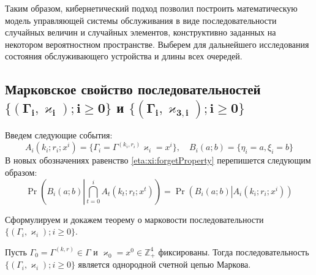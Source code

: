 \documentclass[a4paper,12pt,russian]{extarticle}
\newcommand{\Mark}{\{(\Gamma_i, \varkappa_i); i \geqslant 0\}}
\newcommand{\MarkThree}{\{(\Gamma_i, \varkappa_{3,i}); i \geqslant 0\}}
\begin{document}
Таким образом, кибернетический подход позволил построить математическую модель управляющей системы обслуживания в виде последовательности случайных величин и случайных элементов, конструктивно заданных на некотором вероятностном пространстве. Выберем для дальнейшего исследования состояния обслуживающего устройства и длины всех очередей.

\subsection[Марковское свойство последовательностей $\boldsymbol{\Mark}$ и $\boldsymbol{\MarkThree}$]%
{Марковское свойство последовательностей \\ $\boldsymbol{\Mark}$ и $\boldsymbol{\MarkThree}$}

Введем следующие события:
\begin{equation*}
A_i(k_i;r_i;x^i) = \{\Gamma_i=\Gamma^{(k_i,r_i)}\varkappa_i=x^i\}, \quad  B_i(a;b) = \{\eta_i=a, \xi_i=b\}
\end{equation*}
В новых обозначениях равенство \eqref{eta:xi:forgetProperty}  перепишется следующим образом:
\begin{equation}
\Pr \left(B_i(a;b) \left| \bigcap_{t=0}^{i} A_t(k_t;r_t;x^t)\right.\right) = \Pr \left(B_i(a;b) \left|  A_i(k_i;r_i;x^i)\right.\right)
\label{new:notation:eta:xi:forget}
\end{equation}

Сформулируем и докажем теорему о марковости последовательности \linebreak$\Mark$.
\begin{theorem}
Пусть $\Gamma_0=\Gamma^{(k,r)}\in \Gamma$ и $\varkappa_0=x^0\in \mathbb{Z}_+^4$ фиксированы. Тогда последовательность $\Mark$ является однородной счетной цепью Маркова. 
\end{theorem}
\end{document}
